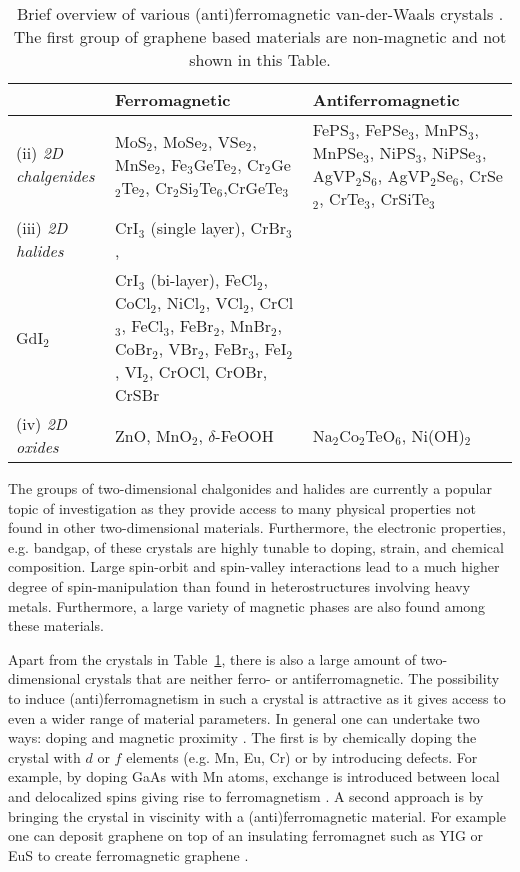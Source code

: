 \begin{table}[]
    \centering
    \begin{tabular}{l>{\raggedright}p{4cm}>{\raggedright\arraybackslash}p{4cm}}
    & \textbf{Ferromagnetic} & \textbf{Antiferromagnetic}\\\midrule
       (ii)  \textit{2D chalgenides}  & 
       MoS$_2$, MoSe$_2$, VSe$_2$, MnSe$_2$, Fe$_3$GeTe$_2$, Cr$_2$Ge$_2$Te$_2$, Cr$_2$Si$_2$Te$_6$,CrGeTe$_3$
       &
       FePS$_3$, FePSe$_3$, MnPS$_3$,  MnPSe$_3$, NiPS$_3$, NiPSe$_3$, AgVP$_2$S$_6$, AgVP$_2$Se$_6$,  CrSe$_2$, CrTe$_3$, CrSiTe$_3$
       \\\midrule
       (iii) \textit{2D halides}
       &
       CrI$_3$ (single layer), CrBr$_3$, \\ GdI$_2$
       &
       CrI$_3$ (bi-layer), FeCl$_2$, CoCl$_2$,  NiCl$_2$, VCl$_2$, CrCl$_3$, FeCl$_3$,  FeBr$_2$,   MnBr$_2$, CoBr$_2$, VBr$_2$,  FeBr$_3$, FeI$_2$, VI$_2$, CrOCl,  CrOBr, CrSBr
       \\\midrule
       (iv)  \textit{2D oxides}    & ZnO, MnO$_2$, $\delta$-FeOOH & Na$_2$Co$_2$TeO$_6$, Ni(OH)$_2$
    \end{tabular}
    \caption{Brief overview of various (anti)ferromagnetic van-der-Waals crystals \cite{sethulakshmi_magnetism_2019,tsymbal_spintronics_2019, liu_chapter_2020}. The first group of graphene based materials are non-magnetic and not shown in this Table. }
    \label{table:crystals}
\end{table}
The groups of two-dimensional chalgonides and halides are currently a popular topic of investigation as they provide access to many physical properties not found in other two-dimensional materials. Furthermore, the electronic properties, e.g. bandgap, of these crystals are highly tunable to doping, strain, and chemical composition. Large spin-orbit and spin-valley interactions lead to a much higher degree of spin-manipulation than found in heterostructures involving heavy metals. Furthermore, a large variety of magnetic phases are also found among these materials.

Apart from the crystals in Table~\ref{table:crystals}, there is also a large amount of two-dimensional crystals that are neither ferro- or antiferromagnetic. The possibility to induce (anti)ferromagnetism in such a crystal is attractive as it gives access to even a wider range of material parameters. In general one can undertake two ways: doping and magnetic proximity \cite{gonzalez-herrero_atomic-scale_2016, han_perspectives_2016, ugeda_missing_2010, han_graphene_2014}. The first is by chemically doping the crystal with $d$ or $f$ elements (e.g. Mn, Eu, Cr) or by introducing defects. For example, by doping GaAs with Mn atoms, exchange is introduced between local and delocalized spins giving rise to ferromagnetism \cite{dietl_dilute_2014}. A second approach is by bringing the crystal in viscinity with a (anti)ferromagnetic material. For example one can deposit graphene on top of an insulating ferromagnet such as YIG or EuS to create ferromagnetic graphene \cite{wang_proximity-induced_2015,leutenantsmeyer_proximity_2016}.

